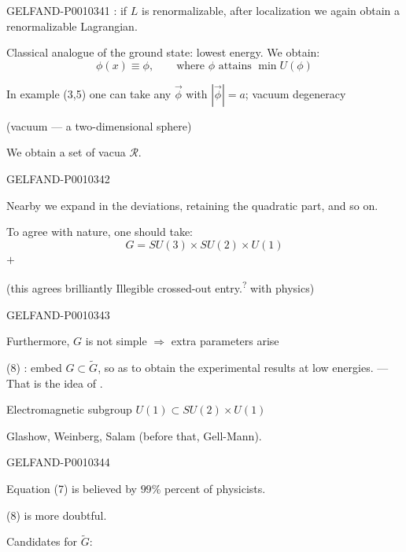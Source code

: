 \begin{GelfandAdjacentEvidence}{GELFAND-P001034}{1}
: if $L$ is renormalizable, after localization we again obtain a renormalizable Lagrangian.

Classical analogue of the ground state: lowest energy. We obtain:
\begin{equation*}
\phi(x)\equiv\phi,\qquad \text{where }\phi\text{ attains }\min U(\phi)
\tag{6}
\end{equation*}

In example (3,5) one can take any $\vec\phi$ with $|\vec\phi|=a$; vacuum degeneracy

(vacuum --- a two-dimensional sphere)

We obtain a set of vacua $\mathcal R$.

\end{GelfandAdjacentEvidence}
\begin{GelfandAdjacentEvidence}{GELFAND-P001034}{2}

Nearby we expand in the deviations, retaining the quadratic part, and so on.

To agree with nature, one should take:
\begin{equation*}
G=SU(3)\times SU(2)\times U(1)
\tag{7}
\end{equation*}
$+$ 

(this agrees brilliantly Illegible crossed-out entry.\textsuperscript{?} with physics)
\end{GelfandAdjacentEvidence}
\begin{GelfandAdjacentEvidence}{GELFAND-P001034}{3}


Furthermore, $G$ is not simple $\Rightarrow$ extra parameters arise

(8) : embed $G\subset\widetilde G$, so as to obtain the experimental results at low energies.
--- That is the idea of .

Electromagnetic subgroup $U(1)\subset SU(2)\times U(1)$

Glashow, Weinberg, Salam (before that, Gell-Mann).
\end{GelfandAdjacentEvidence}
\begin{GelfandAdjacentEvidence}{GELFAND-P001034}{4}


Equation (7) is believed by $99\%$ percent of physicists.

(8) is more doubtful.

Candidates for $\widetilde G$:
\end{GelfandAdjacentEvidence}

